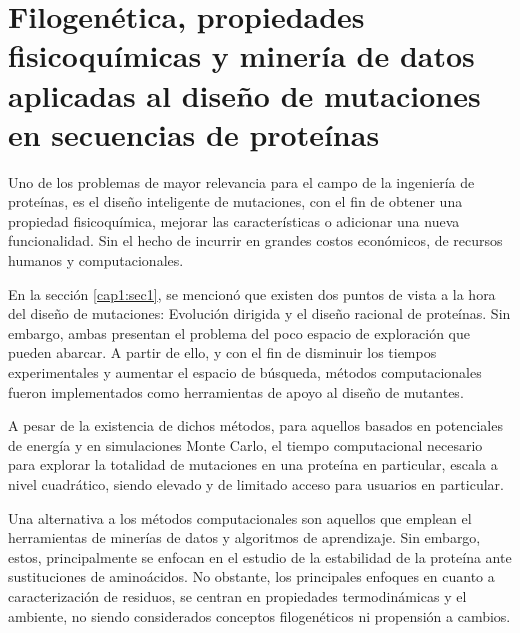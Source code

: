 \chapter{Filogenética, propiedades fisicoquímicas y minería de datos aplicadas al diseño de mutaciones en secuencias de proteínas \label{cap4}}

\ifpdf
    \graphicspath{{Chapter4/Figs/Raster/}{Chapter4/Figs/PDF/}{Chapter4/Figs/}}
\else
    \graphicspath{{Chapter4/Figs/Vector/}{Chapter4/Figs/}}
\fi

Uno de los problemas de mayor relevancia para el campo de la ingeniería de proteínas, es el diseño inteligente de mutaciones, con el fin de obtener una propiedad fisicoquímica, mejorar las características o adicionar una nueva funcionalidad. Sin el hecho de incurrir en grandes costos económicos, de recursos humanos y computacionales.

En la sección \ref{cap1:sec1}, se mencionó que existen dos puntos de vista a la hora del diseño de mutaciones: Evolución dirigida y el diseño racional de proteínas. Sin embargo, ambas presentan el problema del poco espacio de exploración que pueden abarcar. A partir de ello, y con el fin de disminuir los tiempos experimentales y aumentar el espacio de búsqueda, métodos computacionales fueron implementados como herramientas de apoyo al diseño de mutantes. 

A pesar de la existencia de dichos métodos, para aquellos basados en potenciales de energía y en simulaciones Monte Carlo, el tiempo computacional necesario para explorar la totalidad de mutaciones en una proteína en particular, escala a nivel cuadrático, siendo elevado y de limitado acceso para usuarios en particular.

Una alternativa a los métodos computacionales son aquellos que emplean el herramientas de minerías de datos y algoritmos de aprendizaje. Sin embargo, estos, principalmente se enfocan en el estudio de la estabilidad de la proteína ante sustituciones de aminoácidos. No obstante, los principales enfoques en cuanto a caracterización de residuos, se centran en propiedades termodinámicas y el ambiente, no siendo considerados conceptos filogenéticos ni propensión a cambios. 

